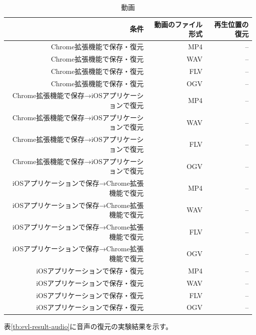 \begin{table}[htbp]
  \caption{動画}
  \label{tb:evl-result-video}
  \begin{center}
    \begin{tabular}{rrr}
      \hline
      条件 & 動画のファイル形式 & 再生位置の復元 \\ \hline \hline
      Chrome拡張機能で保存・復元 & MP4 & --  \\ \hline
      Chrome拡張機能で保存・復元 & WAV & --  \\ \hline
      Chrome拡張機能で保存・復元 & FLV & --  \\ \hline
      Chrome拡張機能で保存・復元 & OGV & --  \\ \hline
      Chrome拡張機能で保存→iOSアプリケーションで復元 & MP4 & --  \\ \hline
      Chrome拡張機能で保存→iOSアプリケーションで復元 & WAV & --  \\ \hline
      Chrome拡張機能で保存→iOSアプリケーションで復元 & FLV & --  \\ \hline
      Chrome拡張機能で保存→iOSアプリケーションで復元 & OGV & --  \\ \hline
      iOSアプリケーションで保存→Chrome拡張機能で復元 & MP4 & --  \\ \hline
      iOSアプリケーションで保存→Chrome拡張機能で復元 & WAV & --  \\ \hline
      iOSアプリケーションで保存→Chrome拡張機能で復元 & FLV & --  \\ \hline
      iOSアプリケーションで保存→Chrome拡張機能で復元 & OGV & --  \\ \hline
      iOSアプリケーションで保存・復元 & MP4 & --  \\ \hline
      iOSアプリケーションで保存・復元 & WAV & --  \\ \hline
      iOSアプリケーションで保存・復元 & FLV & --  \\ \hline
      iOSアプリケーションで保存・復元 & OGV & --  \\ \hline
    \end{tabular}
  \end{center}
\end{table}

表\ref{tb:evl-result-audio}に音声の復元の実験結果を示す。

